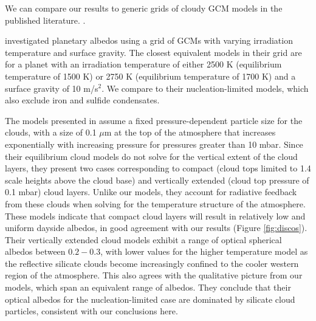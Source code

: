 \documentclass[twocolumn]{aastex63}
\begin{document}
We can compare our results to generic grids of cloudy GCM models in the published literature. . 

\color{black}\citet{roman2021} investigated planetary albedos using a grid of GCMs with varying irradiation temperature and surface gravity. The closest equivalent models in their grid are for a planet with an irradiation temperature of either 2500 K (equilibrium temperature of 1500 K) or 2750 K (equilibrium temperature of 1700 K) and a surface gravity of 10 m/s$^2$.  We compare to their nucleation-limited models, which also exclude iron and sulfide condensates.   

The models presented in \citet{roman2021} assume a fixed pressure-dependent particle size for the clouds, with a size of 0.1 $\mu$m at the top of the atmosphere that increases exponentially with increasing pressure for pressures greater than 10 mbar.  Since their equilibrium  cloud models do not solve for the vertical extent of the cloud layers, they present two cases corresponding to compact (cloud tops limited to 1.4 scale heights above the cloud base) and vertically extended (cloud top pressure of 0.1 mbar) cloud layers. Unlike our models, they account for radiative feedback from these clouds when solving for the temperature structure of the atmosphere. These models indicate that compact cloud layers will result in relatively low and uniform dayside albedos, in good agreement with our results (Figure \ref{fig:discos}).  Their vertically extended cloud models exhibit a range of optical spherical albedos between $0.2-0.3$, with lower values for the higher temperature model as the reflective silicate clouds become increasingly confined to the cooler western region of the atmosphere.  This also agrees with the qualitative picture from our models, which span an equivalent range of albedos.  They  conclude that their optical albedos for the nucleation-limited case are dominated by silicate cloud particles, consistent with our conclusions here.  
\end{document}
